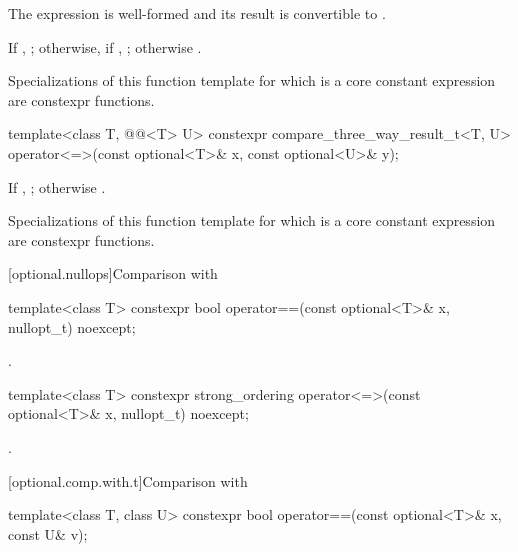 \begin{itemdescr}
\pnum
\constraints
The expression  is well-formed and
its result is convertible to .

\pnum
\returns
If , ;
otherwise, if , ;
otherwise .

\pnum
\remarks
Specializations of this function template
for which  is a core constant expression
are constexpr functions.
\end{itemdescr}

%
\begin{itemdecl}
template<class T, @@<T> U>
  constexpr compare_three_way_result_t<T, U>
    operator<=>(const optional<T>& x, const optional<U>& y);
\end{itemdecl}

\begin{itemdescr}
\pnum
\returns
If , ; otherwise .

\pnum
\remarks
Specializations of this function template
for which  is a core constant expression
are constexpr functions.
\end{itemdescr}

[optional.nullops]{Comparison with }

%
\begin{itemdecl}
template<class T> constexpr bool operator==(const optional<T>& x, nullopt_t) noexcept;
\end{itemdecl}

\begin{itemdescr}
\pnum
\returns
{}.
\end{itemdescr}

%
\begin{itemdecl}
template<class T> constexpr strong_ordering operator<=>(const optional<T>& x, nullopt_t) noexcept;
\end{itemdecl}

\begin{itemdescr}
\pnum
\returns
{}.
\end{itemdescr}

[optional.comp.with.t]{Comparison with }

%
\begin{itemdecl}
template<class T, class U> constexpr bool operator==(const optional<T>& x, const U& v);
\end{itemdecl}

